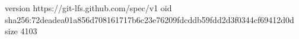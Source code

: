 version https://git-lfs.github.com/spec/v1
oid sha256:72deadea01a856d708161717b6c23e76209fdcddb59fdd2d3f0344cf69412d0d
size 4103
